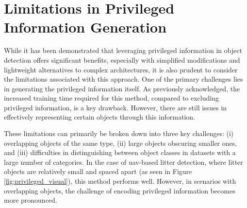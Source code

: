 \section{Limitations in Privileged Information Generation}
\label{sec:5_fail_cases_priv_info_gen}

While it has been demonstrated that leveraging privileged information in object detection offers significant benefits, especially with simplified modifications and lightweight alternatives to complex architectures, it is also prudent to consider the limitations associated with this approach. One of the primary challenges lies in generating the privileged information itself. As previously acknowledged, the increased training time required for this method, compared to excluding privileged information, is a key drawback. However, there are still issues in effectively representing certain objects through this information.

These limitations can primarily be broken down into three key challenges: (i) overlapping objects of the same type, (ii) large objects obscuring smaller ones, and (iii) difficulties in distinguishing between object classes in datasets with a large number of categories. In the case of \gls{uav}-based litter detection, where litter objects are relatively small and spaced apart (as seen in Figure \ref{fig:privileged_visual}), this method performs well. However, in scenarios with overlapping objects, the challenge of encoding privileged information becomes more pronounced.


